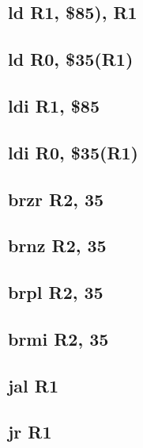 \documentclass{article}
\begin{document}
    \subsection{ld R1, \$85), R1} \label{ld_case_1_sequence}
        
    \subsection{ld R0, \$35(R1)} \label{ld_case_2_sequence}
        
    \subsection{ldi R1, \$85} \label{ldi_case_1_sequence}
        
    \subsection{ldi R0, \$35(R1)} \label{ldi_case_2_sequence}
        
    \subsection{brzr R2, 35} \label{brzr_sequence}
        
    \subsection{brnz R2, 35} \label{brnz_sequence}
        
    \subsection{brpl R2, 35} \label{brpl_sequence}
        
    \subsection{brmi R2, 35} \label{brmi_sequence}
        
    \subsection{jal R1} \label{jal_sequence}
        
    \subsection{jr R1} \label{jr_sequence}
        
\end{document}
